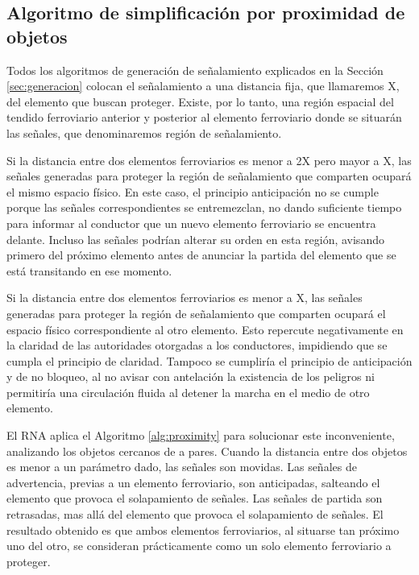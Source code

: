    \subsection{Algoritmo de simplificación por proximidad de objetos}

    
    Todos los algoritmos de generación de señalamiento explicados en la Sección \ref{sec:generacion} colocan el señalamiento a una distancia fija, que llamaremos X, del elemento que buscan proteger. Existe, por lo tanto, una región espacial del tendido ferroviario anterior y posterior al elemento ferroviario donde se situarán las señales, que denominaremos región de señalamiento. 
    
    Si la distancia entre dos elementos ferroviarios es menor a 2X pero mayor a X, las señales generadas para proteger la región de señalamiento que comparten ocupará el mismo espacio físico. En este caso, el principio anticipación no se cumple porque las señales correspondientes se entremezclan, no dando suficiente tiempo para informar al conductor que un nuevo elemento ferroviario se encuentra delante. Incluso las señales podrían alterar su orden en esta región, avisando primero del próximo elemento antes de anunciar la partida del elemento que se está transitando en ese momento.

    Si la distancia entre dos elementos ferroviarios es menor a X, las señales generadas para proteger la región de señalamiento que comparten ocupará el espacio físico correspondiente al otro elemento. Esto repercute negativamente en la claridad de las autoridades otorgadas a los conductores, impidiendo que se cumpla el principio de claridad. Tampoco se cumpliría el principio de anticipación y de no bloqueo, al no avisar con antelación la existencia de los peligros ni permitiría una circulación fluida al detener la marcha en el medio de otro elemento.

    El RNA aplica el Algoritmo \ref{alg:proximity} para solucionar este inconveniente, analizando los objetos cercanos de a pares. Cuando la distancia entre dos objetos es menor a un parámetro dado, las señales son movidas. Las señales de advertencia, previas a un elemento ferroviario, son anticipadas, salteando el elemento que provoca el solapamiento de señales. Las señales de partida son retrasadas, mas allá del elemento que provoca el solapamiento de señales. El resultado obtenido es que ambos elementos ferroviarios, al situarse tan próximo uno del otro, se consideran prácticamente como un solo elemento ferroviario a proteger.

